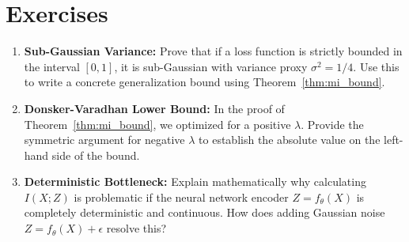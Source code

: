 \section{Exercises}
\begin{enumerate}
    \item \textbf{Sub-Gaussian Variance:} Prove that if a loss function is strictly bounded in the interval $[0, 1]$, it is sub-Gaussian with variance proxy $\sigma^2 = 1/4$. Use this to write a concrete generalization bound using Theorem~\ref{thm:mi_bound}.
    \item \textbf{Donsker-Varadhan Lower Bound:} In the proof of Theorem~\ref{thm:mi_bound}, we optimized for a positive $\lambda$. Provide the symmetric argument for negative $\lambda$ to establish the absolute value on the left-hand side of the bound.
    \item \textbf{Deterministic Bottleneck:} Explain mathematically why calculating $I(X; Z)$ is problematic if the neural network encoder $Z = f_\theta(X)$ is completely deterministic and continuous. How does adding Gaussian noise $Z = f_\theta(X) + \epsilon$ resolve this?
\end{enumerate}

